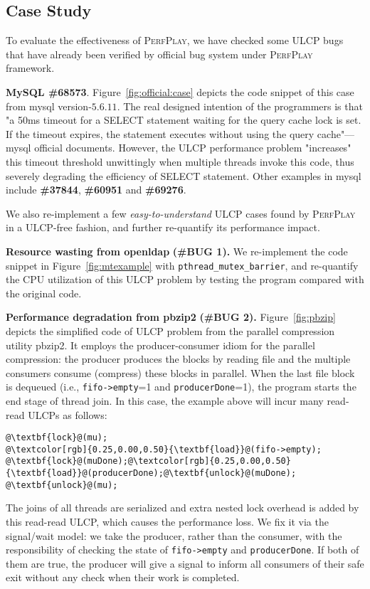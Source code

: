 \subsection{Case Study}
\label{sec:case:study}
To evaluate the effectiveness of \textsc{PerfPlay}, we have checked some ULCP bugs that have already been verified by official bug system under \textsc{PerfPlay} framework.

{\bf MySQL \#68573}. Figure~\ref{fig:official:case} depicts the code snippet of this case from \textsf{mysql} version-$5.6.11$. The real designed intention of the programmers is that "a 50ms timeout for a SELECT statement waiting for the query cache lock is set. If the timeout expires, the statement executes without using the query cache"---\textsf{mysql} official documents. However, the ULCP performance problem "increases" this timeout threshold unwittingly when multiple threads invoke this code, thus severely degrading the efficiency of SELECT statement. Other examples in \textsf{mysql} include \textbf{\#37844}, \textbf{\#60951} and \textbf{\#69276}.

We also re-implement a few \emph{easy-to-understand} ULCP cases found by \textsc{PerfPlay} in a ULCP-free fashion, and further re-quantify its performance impact.

\textbf{Resource wasting from openldap} {\bf (\#BUG 1).} We re-implement the code snippet in Figure~\ref{fig:mtexample} with \texttt{pthread\_mutex\_barrier}, and re-quantify the CPU utilization of this ULCP problem by testing the program compared with the original code. 

\textbf{Performance degradation from pbzip2} {\bf (\#BUG 2).} Figure~\ref{fig:pbzip} depicts the simplified code of ULCP problem from the parallel compression utility pbzip2. It employs the producer-consumer idiom for the parallel compression: the producer produces the blocks by reading file and the multiple consumers consume (compress) these blocks in parallel. When the last file block is dequeued (i.e., \texttt{fifo->empty}=1 and \texttt{producerDone}=1), the program starts the end stage of thread join. In this case, the example above will incur many read-read ULCPs as follows:
\begin{lstlisting}[escapechar=@]
@\textbf{lock}@(mu);
@\textcolor[rgb]{0.25,0.00,0.50}{\textbf{load}}@(fifo->empty);
@\textbf{lock}@(muDone);@\textcolor[rgb]{0.25,0.00,0.50}{\textbf{load}}@(producerDone);@\textbf{unlock}@(muDone);
@\textbf{unlock}@(mu);
\end{lstlisting}
The joins of all threads are serialized and extra nested lock overhead is added by this read-read ULCP, which causes the performance loss. We fix it via the signal/wait model: we take the producer, rather than the consumer, with the responsibility of checking the state of \texttt{fifo->empty} and \texttt{producerDone}. If both of them are \textsf{true}, the producer will give a signal to inform all consumers of their safe exit without any check when their work is completed.

